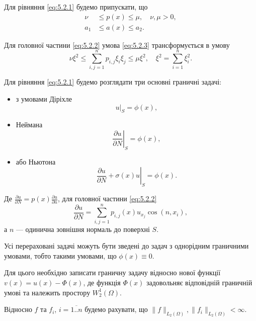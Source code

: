 Для рівняння \eqref{eq:5.2.1} будемо припускати, що 
\begin{align}
    \label{eq:5.2.3}
    \nu &\le p(x) \le \mu, \quad \nu, \mu > 0, \\
    \label{eq:5.2.3'}
    a_1 &\le a(x) \le a_2.
\end{align}

Для головної частини \eqref{eq:5.2.2} умова \eqref{eq:5.2.3} трансформується в умову
\begin{equation}
    \label{eq:5.2.3''}
    \nu \xi^2 \le \sum_{i,j=1}^n p_{i,j} \xi_i \xi_j \le \mu \xi^2, \quad \xi^2 = \sum_{i = 1}^n \xi_i^2.
\end{equation}

Для рівняння \eqref{eq:5.2.1} будемо розглядати три основні граничні задачі:
\begin{itemize}
    \item з умовами Діріхле
    \begin{equation}
        \label{eq:5.2.4}
        \left. u \right|_S = \phi(x), 
    \end{equation}
    \item Неймана
    \begin{equation}
        \label{eq:5.2.5}
        \left. \frac{\partial u}{\partial N} \right|_S = \phi(x), 
    \end{equation}
    \item або Ньютона
    \begin{equation}
        \label{eq:5.2.6}
        \left. \frac{\partial u}{\partial N} + \sigma(x) u \right|_S = \phi(x).
    \end{equation}
\end{itemize}

Де $\frac{\partial u}{\partial N} = p(x) \frac{\partial u}{\partial n}$, для головної частини \eqref{eq:5.2.2} \[\frac{\partial u}{\partial N} = \sum_{i,j=1}^n p_{i,j}(x) u_{x_j} \cos (n, x_i),\] а $n$ --- одинична зовнішня нормаль до поверхні $S$. \medskip

Усі перераховані задачі можуть бути зведені до задач з однорідним граничними умовами, тобто такими умовами, що $\phi(x) \equiv 0$. \medskip

Для цього необхідно записати граничну задачу відносно нової функції $v(x) = u(x) - \Phi(x)$, де функція $\Phi(x)$ задовольняє відповідній граничній умові та належить простору $W_2^1(\Omega)$. \medskip

Відносно $f$ та $f_i$, $i = \overline{1..n}$ будемо рахувати, що $\|f\|_{L_2(\Omega)}, \|f_i\|_{L_2(\Omega)} < \infty$. \medskip

